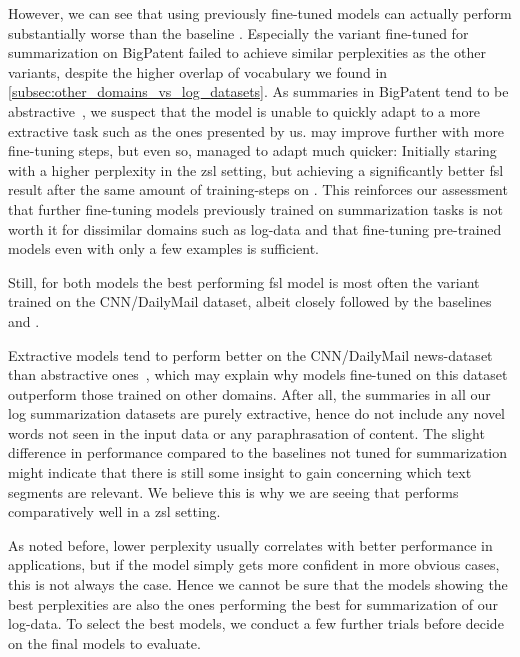 However, we can see that using previously fine-tuned models
can actually perform substantially worse than the baseline .
Especially the variant fine-tuned for summarization on BigPatent failed to achieve similar perplexities as the other variants,
despite the higher overlap of vocabulary we found in \autoref{subsec:other_domains_vs_log_datasets}.
As summaries in BigPatent tend to be abstractive~\parencite[2204-2205]{bigpatent},
we suspect that the model is unable to quickly adapt to a more extractive task such as the ones presented by us.
 may improve further with more fine-tuning steps,
but even so,  managed to adapt much quicker:
Initially staring with a higher perplexity in the \ac{zsl} setting,
but achieving a significantly better \ac{fsl} result after the same amount of training-steps on \logsummary{}.
This reinforces our assessment that further fine-tuning models previously trained on summarization tasks
is not worth it for dissimilar domains such as log-data
and that fine-tuning pre-trained models even with only a few examples is sufficient.

Still, for both models the best performing \ac{fsl} model
is most often the variant trained on the CNN/DailyMail dataset,
albeit closely followed by the baselines  and .

Extractive models tend to perform better on the CNN/DailyMail news-dataset than abstractive ones~\parencite[547]{summarization_critical_evaluation},
which may explain why models fine-tuned on this dataset outperform those trained on other domains.
After all, the summaries in all our log summarization datasets are purely extractive,
hence do not include any novel words not seen in the input data or any paraphrasation of content.
The slight difference in performance compared to the baselines not tuned for summarization
might indicate that there is still some insight to gain concerning which text segments are relevant.
We believe this is why we are seeing that  performs comparatively well in a \ac{zsl} setting.

As noted before, lower perplexity usually correlates with better performance in applications,
but if the model simply gets more confident in more obvious cases, this is not always the case.
Hence we cannot be sure that the models showing the best perplexities
are also the ones performing the best for summarization of our log-data.
To select the best models, we conduct a few further trials before decide on the final models to evaluate.

